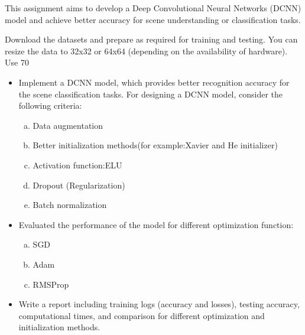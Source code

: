 \documentclass[12pt,oneside,geqno]{article}
\begin{document}
	\begin{Problem}[b]
		This assignment aims to develop a Deep Convolutional Neural Networks (DCNN) model and achieve better accuracy for scene understanding or classification tasks.
		
		Download the datasets and prepare as required for training and testing. You can resize the data to 32x32 or 64x64 (depending on the availability of hardware). Use 70%
		
		\begin{itemize}
			
			\item Implement a DCNN model, which provides better recognition accuracy for the scene classification tasks. For designing a DCNN model, consider the following criteria:
			
			\begin{enumerate}[a)]
				
				\item Data augmentation
				\item Better initialization methods(for example:Xavier and He initializer)
				\item Activation function:ELU
				\item Dropout (Regularization)
				\item Batch normalization
				
			\end{enumerate}
			
			
			
			\item Evaluated the performance of the model for different optimization function:
			\begin{enumerate}[a)]
				\item SGD
				\item Adam
				\item RMSProp
				
			\end{enumerate}
			
			\item Write a report including training logs (accuracy and losses), testing accuracy, computational times, and comparison for different optimization and initialization methods. 
		\end{itemize}
		

\end{Problem}
\end{document}
